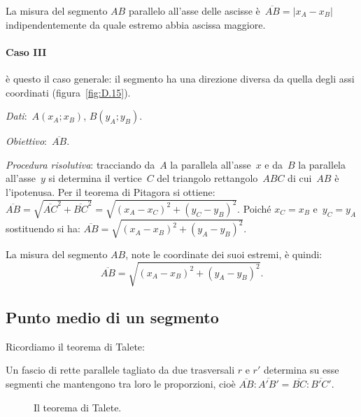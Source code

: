 La misura del segmento $AB$ parallelo all'asse delle ascisse è~$\overline{AB}=|x_{A}-x_{B}|$
indipendentemente da quale estremo abbia ascissa maggiore.

\paragraph{Caso III} è questo il caso generale: il segmento ha una direzione diversa da quella degli assi coordinati (figura~\ref{fig:D.15}).

\emph{Dati}:~$A(x_A;x_B)$, $B(y_A;y_B)$.

\emph{Obiettivo}:~$\overline{AB}$.

\emph{Procedura risolutiva}: tracciando da~$A$ la parallela all'asse~$x$ e da~$B$ la parallela all'asse~$y$
si determina il vertice~$C$ del triangolo rettangolo~$ABC$ di cui~$AB$ è l'ipotenusa.
Per il teorema di Pitagora si ottiene:~$\overline{AB}=\sqrt{\overline{AC}^2 + \overline{BC}^2}=\sqrt{\left(x_A-x_C \right)^2+
\left(y_C-y_B \right)^2}$. %
Poiché $x_{C}=x_{B}$ e~$y_{C}=y_{A}$ sostituendo si ha:
$\overline{AB}=\sqrt{\left(x_{A}-x_{B}\right)^{2}+\left(y_{A}-y_{B}\right)^{2}}$.

La misura del segmento $AB$, note le coordinate dei suoi estremi, è quindi:
\[\overline{AB}=\sqrt{\left(x_{A}-x_{B}\right)^{2}+\left(y_{A}-y_{B}\right)^{2}}.\]

\ovalbox{\risolvii \ref{ese:D.19}, \ref{ese:D.20}, \ref{ese:D.21}, \ref{ese:D.22}, \ref{ese:D.23}, \ref{ese:D.24}, \ref{ese:D.25}, \ref{ese:D.26},
\ref{ese:D.27}, \ref{ese:D.28}, \ref{ese:D.29}, \ref{ese:D.30}}

\vspazio\ovalbox{\ref{ese:D.31}}
\subsection{Punto medio di un segmento}
Ricordiamo il teorema di Talete:

\begin{teorema}[di Talete]
Un fascio di rette parallele tagliato da due trasversali $r$ e $r'$ determina su esse segmenti che mantengono tra loro le proporzioni, cioè $\overline{AB}:\overline{A'B'}=\overline{BC}:\overline{B'C'}$.
\end{teorema}

\begin{figure}[h]
 \centering
 \caption{Il teorema di Talete.}\label{fig:D.16}
 \end{figure}

